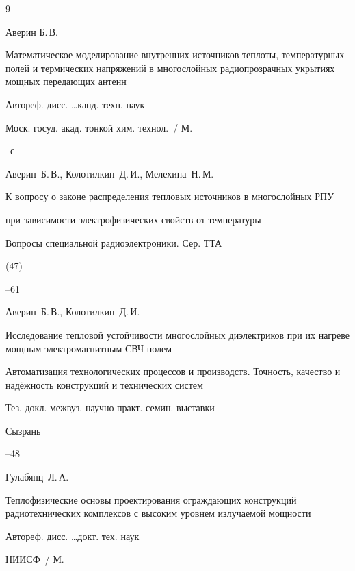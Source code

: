 \begin{thebibliography}{9}


\by Аверин Б.\,В.

\book Математическое моделирование внутренних источников теплоты, температурных полей и термических напряжений в многослойных радиопрозрачных укрытиях мощных передающих антенн

\bookinfo Автореф. дисс. \dots канд. техн. наук

\publ Моск. госуд. акад. тонкой хим. технол.~/ М.


~с




\by Аверин~Б.\,В., Колотилкин~Д.\,И., Мелехина~Н.\,М.

\paper К вопросу о законе распределения тепловых источников в многослойных РПУ

при зависимости электрофизических свойств от температуры

\jour Вопросы специальной радиоэлектроники. Сер. ТТА

(47)


--61




\by Аверин~Б.\,В., Колотилкин~Д.\,И.

\paper Исследование тепловой устойчивости многослойных диэлектриков при их нагреве мощным электромагнитным СВЧ-полем

\inbook Автоматизация технологических процессов и производств. Точность, качество и надёжность конструкций и технических систем

\bookinfo Тез. докл. межвуз. научно-практ. семин.-выставки

\publaddr Сызрань


--48




\by Гулабянц~Л.\,А.

\book Теплофизические основы проектирования ограждающих конструкций радиотехнических комплексов с высоким уровнем излучаемой мощности

\bookinfo Автореф. дисс. \dots докт. тех. наук

\publ НИИСФ~/ М.


\end{thebibliography}
